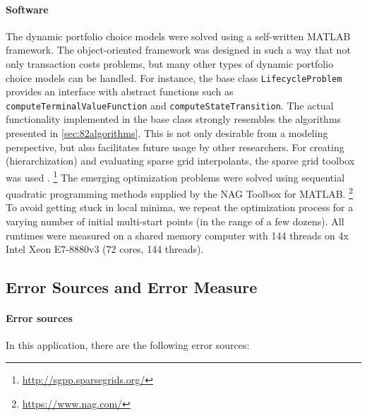 \vspace*{-0.5em}

\paragraph{Software}

The dynamic portfolio choice models were solved using a self-written
MATLAB framework.
The object-oriented framework was designed in such a way that
not only transaction costs problems,
but many other types of dynamic portfolio choice models can be handled.
For instance, the base class \texttt{LifecycleProblem} provides
an interface with abstract functions such as
\texttt{computeTerminalValueFunction} and
\texttt{computeStateTransition}.
The actual functionality implemented in the base class strongly resembles
the algorithms presented in \cref{sec:82algorithms}.
This is not only desirable from a modeling perspective,
but also facilitates future usage by other researchers.
For creating (hierarchization) and evaluating sparse grid interpolants,
the sparse grid toolbox \sgpp was used \cite{Pflueger10Spatially}.%
\footnote{%
  \url{http://sgpp.sparsegrids.org/}%
}
The emerging optimization problems were solved using
sequential quadratic programming methods supplied by the
NAG Toolbox for MATLAB.%
\footnote{%
  \url{https://www.nag.com/}%
}
To avoid getting stuck in local minima,
we repeat the optimization process for a varying number
of initial multi-start points (in the range of a few dozens).
All runtimes were measured on a shared memory computer
with 144 threads on 4x Intel Xeon E7-8880v3 (72 cores, 144 threads).



\subsection{Error Sources and Error Measure}
\label{sec:842errorSources}

\paragraph{Error sources}

In this application, there are the following error sources:

